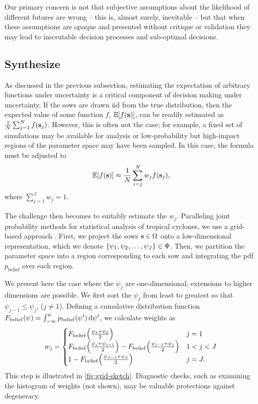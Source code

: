 \documentclass{agujournal2019}
\begin{document}
Our primary concern is not that subjective assumptions about the likelihood of different futures are wrong -- this is, almost surely, inevitable -- but that when these assumptions are opaque and presented without critique or validation they may lead to inscrutable decision processes and sub-optimal decisions.

\subsection{Synthesize}\label{sec:analysis-synthesize}

As discussed in the previous subsection, estimating the expectation of arbitrary functions under uncertainty is a critical component of decision making under uncertainty.
If the \glspl{sow} are drawn \gls{iid} from the true distribution, then the expected value of some function  $f$, $\mathbb{E}\qty[f(\vb{s})]$, can be readily estimated as $\frac{1}{N} \sum_{j=1}^N f(\vb{s}_j)$.
However, this is often not the case; for example, a fixed set of simulations may be available for analysis or low-probability but high-impact regions of the parameter space may have been sampled.
In this case, the formula must be adjusted to
\begin{equation}
  \mathbb{E}\qty[f(\vb{s})] \approx \frac{1}{N} \sum_{i=j}^N w_j f(\vb{s}_j),
\end{equation}
where $\sum_{j=1}^J w_j = 1$.

The challenge then becomes to suitably estimate the $w_j$.
Paralleling joint probability methods for statistical analysis of tropical cyclones, we use a grid-based approach \cite{johnson_clara:2013,resio_probabilities:2007,toro_jpm-os:2010}.
First, we project the \glspl{sow} $\vb{s} \in \Omega$ onto a low-dimensional representation, which we denote $\qty{\psi_1, \psi_2, \ldots, \psi_J} \in \Psi$.
Then, we partition the parameter space into a region corresponding to each \gls{sow} and integrating the \gls{pdf} $p_\mathrm{belief}$ over each region.

We present here the case where the $\psi_j$ are one-dimensional; extensions to higher dimensions are possible.
We first sort the $\psi_j$  from least to greatest so that $\psi_{j-1} \leq \psi_j$, ($j \neq 1$).
Defining a cumulative distribution function
$F_\mathrm{belief} \qty(\psi) = \int_{-\infty}^{\psi} p_\mathrm{belief}(\psi') \dd{\psi'}$,
we calculate weights as
\begin{equation}\label{eq:weights}
  w_j = \begin{cases}
    F_\mathrm{belief}\qty(\frac{\psi_1 + \psi_2}{2})                                                              & j = 1     \\
    F_\mathrm{belief}\qty(\frac{\psi_{j} + \psi_{j+1}}{2}) - F_\mathrm{belief}\qty(\frac{\psi_{j-1} + \psi_j}{2}) & 1 < j < J \\
    1 - F_\mathrm{belief}\qty(\frac{\psi_{J-1} + \psi_J}{2})                                                      & j = J.
  \end{cases}
\end{equation}
This step is illustrated in \cref{fig:grid-sketch}.
Diagnostic checks, such as examining the histogram of weights (not shown), may be valuable protections against degeneracy.
\end{document}
